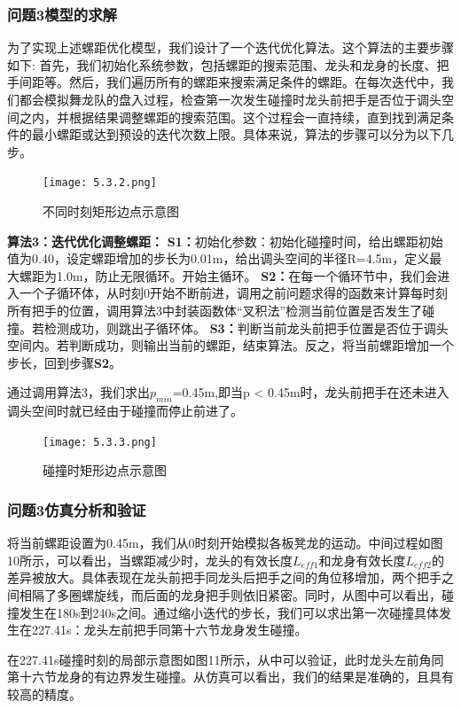 \documentclass{cumcmthesis1}
\begin{document}
\subsubsection{\textbf{问题3}模型的求解}
为了实现上述螺距优化模型，我们设计了一个迭代优化算法。这个算法的主要步骤如下:
首先，我们初始化系统参数，包括螺距的搜索范围、龙头和龙身的长度、把手间距等。然后，我们遍历所有的螺距来搜索满足条件的螺距。在每次迭代中，我们都会模拟舞龙队的盘入过程，检查第一次发生碰撞时龙头前把手是否位于调头空间之内，并根据结果调整螺距的搜索范围。这个过程会一直持续，直到找到满足条件的最小螺距或达到预设的迭代次数上限。具体来说，算法的步骤可以分为以下几步。
\par
\begin{figure}
    \caption{不同时刻矩形边点示意图}
    \centering    
    \texttt{[image: 5.3.2.png]}
\end{figure}
\par
\textbf{算法3：迭代优化调整螺距：}
\newline
\noindent
\textbf{S1：}初始化参数：初始化碰撞时间，给出螺距初始值为0.40，设定螺距增加的步长为0.01m，给出调头空间的半径R=4.5m，定义最大螺距为1.0m，防止无限循环。开始主循环。
\newline
\noindent
\textbf{S2：}在每一个循环节中，我们会进入一个子循环体，从时刻0开始不断前进，调用之前问题求得的函数来计算每时刻所有把手的位置，调用算法3中封装函数体“叉积法”检测当前位置是否发生了碰撞。若检测成功，则跳出子循环体。
\newline
\noindent
\textbf{S3：}判断当前龙头前把手位置是否位于调头空间内。若判断成功，则输出当前的螺距，结束算法。反之，将当前螺距增加一个步长，回到步骤\textbf{S2}。
\par
通过调用算法3，我们求出$p_{min}$=0.45m,即当p < 0.45m时，龙头前把手在还未进入调头空间时就已经由于碰撞而停止前进了。

\par

\begin{figure}
    \caption{碰撞时矩形边点示意图}
    \centering    
    \texttt{[image: 5.3.3.png]}
\end{figure}
\par
\subsubsection{\textbf{问题3}仿真分析和验证}
将当前螺距设置为0.45m，我们从0时刻开始模拟各板凳龙的运动。中间过程如图10所示，可以看出，当螺距减少时，龙头的有效长度$L_{eff1}$和龙身有效长度$L_{eff2}$的差异被放大。具体表现在龙头前把手同龙头后把手之间的角位移增加，两个把手之间相隔了多圈螺旋线，而后面的龙身把手则依旧紧密。同时，从图中可以看出，碰撞发生在180s到240s之间。通过缩小迭代的步长，我们可以求出第一次碰撞具体发生在227.41s：龙头左前把手同第十六节龙身发生碰撞。
\par
在227.41s碰撞时刻的局部示意图如图11所示，从中可以验证，此时龙头左前角同第十六节龙身的有边界发生碰撞。从仿真可以看出，我们的结果是准确的，且具有较高的精度。
\end{document}
